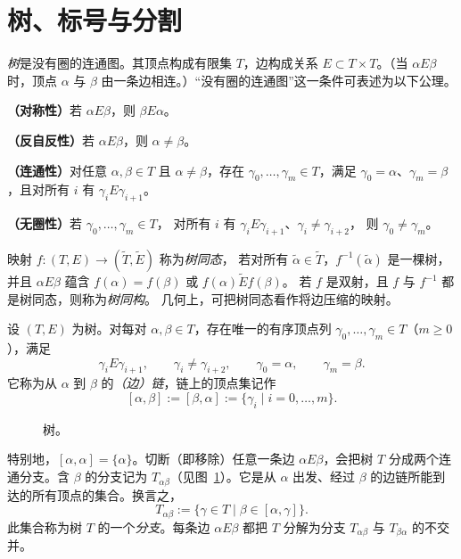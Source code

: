 
\section{树、标号与分割}\label{sec:D-2}

\emph{树}是没有圈的连通图。其顶点构成有限集 $T$，边构成关系
$E\subset T\times T$。（当 $\alpha E\beta$ 时，顶点 $\alpha$ 与 $\beta$
由一条边相连。）“没有圈的连通图”这一条件可表述为以下公理。

\noindent\textbf{（对称性）}若 $\alpha E\beta$，则 $\beta E\alpha$。

\noindent\textbf{（反自反性）}若 $\alpha E\beta$，则 $\alpha\ne\beta$。

\noindent\textbf{（连通性）}对任意 $\alpha,\beta\in T$ 且
$\alpha\ne\beta$，存在 $\gamma_0,\ldots,\gamma_m\in T$，满足
$\gamma_0=\alpha$、$\gamma_m=\beta$，且对所有 $i$ 有
$\gamma_iE\gamma_{i+1}$。

\noindent\textbf{（无圈性）}若 $\gamma_0,\ldots,\gamma_m\in T$，
对所有 $i$ 有 $\gamma_iE\gamma_{i+1}$、$\gamma_i\ne\gamma_{i+2}$，
则 $\gamma_0\ne\gamma_m$。

映射 $f:(T,E)\to(\widetilde T,\widetilde E)$ 称为\emph{树同态}，
若对所有 $\widetilde\alpha\in\widetilde T$，$f^{-1}(\widetilde\alpha)$
是一棵树，并且 $\alpha E\beta$ 蕴含
$f(\alpha)=f(\beta)$ 或 $f(\alpha)\widetilde E f(\beta)$。
若 $f$ 是双射，且 $f$ 与 $f^{-1}$ 都是树同态，则称为\emph{树同构}。
几何上，可把树同态看作将边压缩的映射。

设 $(T,E)$ 为树。对每对 $\alpha,\beta\in T$，存在唯一的有序顶点列
$\gamma_0,\ldots,\gamma_m\in T$（$m\ge0$），满足
\[
  \gamma_iE\gamma_{i+1},\qquad \gamma_i\ne\gamma_{i+2},\qquad
  \gamma_0=\alpha,\qquad\gamma_m=\beta.
\]
它称为从 $\alpha$ 到 $\beta$ 的\emph{（边）链}，链上的顶点集记作
\[
  [\alpha,\beta]:=[\beta,\alpha]:=\{\gamma_i\mid i=0,\ldots,m\}.
\]

\begin{figure}[tbp]
\centering

\caption{树。}\label{fig:D-2-1}
\end{figure}

特别地，$[\alpha,\alpha]=\{\alpha\}$。切断（即移除）任意一条边
$\alpha E\beta$，会把树 $T$ 分成两个连通分支。含 $\beta$ 的分支记为
$T_{\alpha\beta}$（见图~\ref{fig:D-2-1}）。它是从 $\alpha$
出发、经过 $\beta$ 的边链所能到达的所有顶点的集合。换言之，
\[
  T_{\alpha\beta}:=\{\gamma\in T\mid\beta\in[\alpha,\gamma]\}.
\]
此集合称为树 $T$ 的一个\emph{分支}。每条边 $\alpha E\beta$ 都把
$T$ 分解为分支 $T_{\alpha\beta}$ 与 $T_{\beta\alpha}$ 的不交并。

